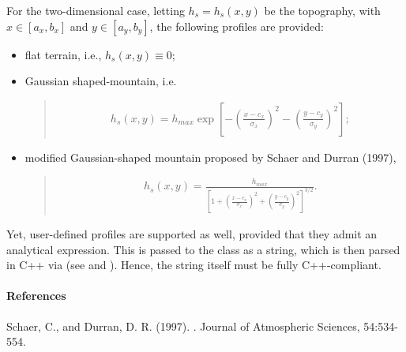 \documentclass[letterpaper,10pt,english]{sphinxmanual}
\begin{document}
For the two-dimensional case, letting \(h_s = h_s(x,y)\) be the topography, with
\(x \in [a_x,b_x]\) and \(y \in [a_y,b_y]\), the following profiles are provided:
\begin{itemize}
\item {} 
flat terrain, i.e., \(h_s(x,y) \equiv 0\);

\item {} 
Gaussian shaped-mountain, i.e.
\begin{quote}
\begin{equation*}
\begin{split}h_s(x,y) = h_{max} \exp{\left[ - \left( \frac{x - c_x}{\sigma_x} \right)^2 - \left( \frac{y - c_y}{\sigma_y} \right)^2 \right]} ;\end{split}
\end{equation*}\end{quote}

\item {} 
modified Gaussian-shaped mountain proposed by Schaer and Durran (1997),
\begin{quote}
\begin{equation*}
\begin{split}h_s(x,y) = \frac{h_{max}}{\left[ 1 + \left( \frac{x - c_x}{\sigma_x} \right)^2 + \left( \frac{y - c_y}{\sigma_y} \right)^2 \right]^{3/2}}.\end{split}
\end{equation*}\end{quote}

\end{itemize}

Yet, user-defined profiles are supported as well, provided that they admit an analytical expression.
This is passed to the class as a string, which is then parsed in C++ via 
(see  and ). Hence, the string itself must be
fully C++-compliant.
\paragraph{References}

Schaer, C., and Durran, D. R. (1997). . Journal of Atmospheric Sciences, 54:534-554.
\end{document}
